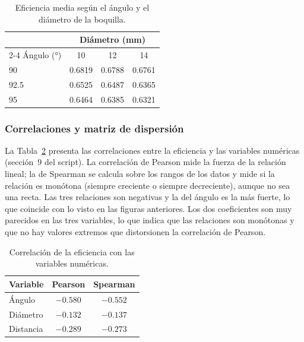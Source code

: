 \begin{table}[H]
\centering
\caption{Eficiencia media según el ángulo y el diámetro de la boquilla.}
\label{tab:angulo_diametro}
\begin{tabular}{lccc}
\toprule
 & \multicolumn{3}{c}{Diámetro (mm)} \\
\cmidrule(lr){2-4}
Ángulo (°) & 10 & 12 & 14 \\
\midrule
90   & 0.6819 & 0.6788 & 0.6761 \\
92.5 & 0.6525 & 0.6487 & 0.6365 \\
95   & 0.6464 & 0.6385 & 0.6321 \\
\bottomrule
\end{tabular}
\end{table}

\subsubsection{Correlaciones y matriz de dispersión}

La Tabla~\ref{tab:correlaciones} presenta las correlaciones entre la eficiencia y las variables numéricas (sección~9 del script). La correlación de Pearson mide la fuerza de la relación lineal; la de Spearman se calcula sobre los rangos de los datos y mide si la relación es monótona (siempre creciente o siempre decreciente), aunque no sea una recta. Las tres relaciones son negativas y la del ángulo es la más fuerte, lo que coincide con lo visto en las figuras anteriores. Los dos coeficientes son muy parecidos en las tres variables, lo que indica que las relaciones son monótonas y que no hay valores extremos que distorsionen la correlación de Pearson.

\begin{table}[H]
\centering
\caption{Correlación de la eficiencia con las variables numéricas.}
\label{tab:correlaciones}
\begin{tabular}{lcc}
\toprule
Variable & Pearson & Spearman \\
\midrule
Ángulo    & $-0.580$ & $-0.552$ \\
Diámetro  & $-0.132$ & $-0.137$ \\
Distancia & $-0.289$ & $-0.273$ \\
\bottomrule
\end{tabular}
\end{table}

